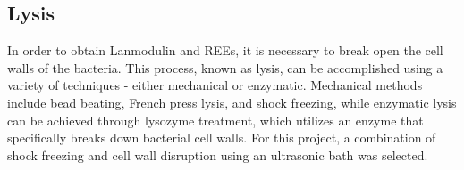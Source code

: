 \subsection{Lysis\authorB}\label{sec:me_lysis}
In order to obtain Lanmodulin and REEs, it is necessary to break open the cell walls of
the bacteria.
This process, known as lysis, can be accomplished using a variety of
techniques - either mechanical or enzymatic.
Mechanical methods include bead beating, French press lysis, and shock freezing, while enzymatic lysis can be achieved through lysozyme treatment, which utilizes an enzyme that specifically breaks down bacterial cell walls.
For this project, a combination of shock freezing and cell wall disruption using an ultrasonic bath was selected.